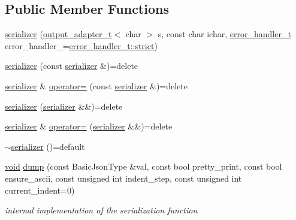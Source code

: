 \subsection*{Public Member Functions}
\begin{DoxyCompactItemize}
\item 
\hyperlink{classnlohmann_1_1detail_1_1serializer_ac010525281d97867ee842da37294fe83}{serializer} (\hyperlink{namespacenlohmann_1_1detail_a9b680ddfb58f27eb53a67229447fc556}{output\+\_\+adapter\+\_\+t}$<$ char $>$ s, const char ichar, \hyperlink{namespacenlohmann_1_1detail_a5a76b60b26dc8c47256a996d18d967df}{error\+\_\+handler\+\_\+t} error\+\_\+handler\+\_\+=\hyperlink{namespacenlohmann_1_1detail_a5a76b60b26dc8c47256a996d18d967dfa2133fd717402a7966ee88d06f9e0b792}{error\+\_\+handler\+\_\+t\+::strict})
\item 
\hyperlink{classnlohmann_1_1detail_1_1serializer_ae3771351ec4cb892bec707edeb56dc31}{serializer} (const \hyperlink{classnlohmann_1_1detail_1_1serializer}{serializer} \&)=delete
\item 
\hyperlink{classnlohmann_1_1detail_1_1serializer}{serializer} \& \hyperlink{classnlohmann_1_1detail_1_1serializer_a5f14c33012477b9f9876dc54d97009a0}{operator=} (const \hyperlink{classnlohmann_1_1detail_1_1serializer}{serializer} \&)=delete
\item 
\hyperlink{classnlohmann_1_1detail_1_1serializer_a28081304e70cca6b3042c101ee5c498c}{serializer} (\hyperlink{classnlohmann_1_1detail_1_1serializer}{serializer} \&\&)=delete
\item 
\hyperlink{classnlohmann_1_1detail_1_1serializer}{serializer} \& \hyperlink{classnlohmann_1_1detail_1_1serializer_acaafe3436ee5fb74777eb4132a88c513}{operator=} (\hyperlink{classnlohmann_1_1detail_1_1serializer}{serializer} \&\&)=delete
\item 
\hyperlink{classnlohmann_1_1detail_1_1serializer_aa6c62b51cbebb185307df851dc0167f0}{$\sim$serializer} ()=default
\item 
\hyperlink{namespacenlohmann_1_1detail_a59fca69799f6b9e366710cb9043aa77d}{void} \hyperlink{classnlohmann_1_1detail_1_1serializer_a95460ebd1a535a543e5a0ec52e00f48b}{dump} (const Basic\+Json\+Type \&val, const bool pretty\+\_\+print, const bool ensure\+\_\+ascii, const unsigned int indent\+\_\+step, const unsigned int current\+\_\+indent=0)
\begin{DoxyCompactList}\small\item\em internal implementation of the serialization function \end{DoxyCompactList}\end{DoxyCompactItemize}
